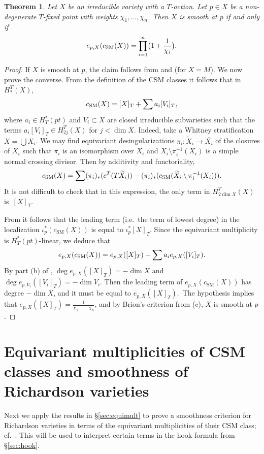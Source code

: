 \documentclass[11pt]{article}
\newtheorem{theorem}[theo]{Theorem}
\theoremstyle{definition}
\numberwithin{equation}{section}
\newcommand{\csm}{c_{\mathrm{SM}}}
\begin{document}
\begin{theorem}\label{thm:csmsmooth} Let $X$ be an irreducible variety with a $T$-action. Let $p \in X$ be a non-degenerate $T$-fixed point with weights $\chi_1, \ldots, \chi_n$. Then $X$ is smooth at $p$ if and only
	if 
	\[ e_{p,X}(\csm(X)) = \prod_{i=1}^n  \bigl(1+ \frac{1}{\chi_i} \bigr) \/.\]
\end{theorem}
\begin{proof}If $X$ is smooth at $p$, the claim follows from  and  (for $X=M$). 
	We now prove the converse. From the definition of the CSM classes it follows that
	in $H_*^T(X)$,
	\begin{equation}\label{E:csmexp} \csm(X) = [X]_T + \sum a_i [V_i]_T \/, \end{equation}
	where $a_i \in H^*_T(pt)$ and $V_i \subset X$ are closed irreducible subvarieties such that the terms 
	$a_i [V_i]_T \in H_{2j}^T(X)$ for $j < \dim X$.
	Indeed, take a Whitney stratification $X = \bigcup X_i$. We may find equivariant desingularizations
	$\pi_i: \widetilde{X}_i \to \overline{X_i}$ of the closures of $X_i$ such that $\pi_i$ is an isomorphism
	over $X_i$ and $\widetilde{X}_i \setminus \pi_i^{-1}(X_i)$ is a simple normal crossing divisor. Then
	by additivity and functoriality, 
	\[ \csm(X) = \sum (\pi_i)_*(c^T ( T \widetilde{X}_i)) - (\pi_i)_*(\csm( \widetilde{X}_i \setminus \pi_i^{-1}(X_i))) \/. \]
	It is not difficult to check that in this expression, the only term in $H_{2 \dim X}^T(X)$ is~$[X]_T$.
	
	From  it follows that the leading term (i.e.~the term of lowest degree) in the localization $\iota_p^* (\csm(X))$ is equal to $\iota_p^*[X]_T$. Since the equivariant multiplicity is $H^*_T(pt)$-linear, we deduce that 
	\[ e_{p,X}(\csm(X)) = e_{p,X}([X]_T) + \sum a_i e_{p,X}([V_i]_T) \/. \] By part (b) of , $\deg e_{p,X}([X]_T) 
	= - \dim X$ and $\deg e_{p,V_i}([V_i]_T) = - \dim V_i $. Then the leading term of $e_{p,X}(\csm(X))$ has degree 
	$-\dim X$, and it must be equal to $e_{p,X}([X]_T)$.~The hypothesis implies that 
	$e_{p,X}([X]_T)= \frac{1}{\chi_1 \cdot \ldots \cdot \chi_n}$, and by Brion's criterion from (c), $X$ is smooth at $p$.
\end{proof}

\section{Equivariant multiplicities of CSM classes and smoothness of Richardson varieties}
Next we apply the results in \S\ref{sec:equimult} to prove a smoothness criterion for Richardson varieties in terms of the equivariant multiplicities of their CSM class; cf.~. This will be used to interpret certain terms in
the hook formula from \S\ref{sec:hook}.
\end{document}
